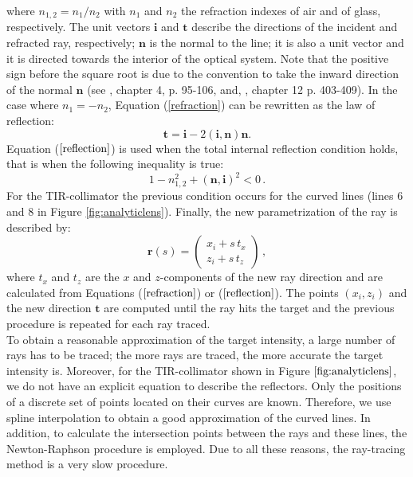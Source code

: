 where $n_{1,2}=n_1/n_2$ with $n_1$ and $n_2$ the refraction indexes of air and of glass, respectively.
The unit vectors $\textbf{i}$ and $\textbf{t}$ describe the directions of the incident and refracted ray, respectively; $\textbf{n}$ is the normal to the line; it is also a unit vector and it is directed towards the interior of the optical system.
Note that the positive sign before the square root is due to the convention to take the inward direction of the normal $\textbf{n}$ (see \cite{hecht1998hecht}, chapter 4, p. 95-106, and, \cite{chaves2008introduction}, chapter 12 p. 403-409).
In the case where $n_1 = -n_2$, Equation (\ref{refraction}) can be rewritten as the law of reflection:
\begin{equation}\label{reflection}
\textbf{t} = \textbf{i}-2(\textbf{i}, \textbf{n})\textbf{n}.
\end{equation}
Equation ($\ref{reflection}$) is used when the total internal reflection condition holds, that is when the following inequality is true:
\begin{equation}\label{eq: Tir-condition}
1-n_{1,2}^2+(\textbf{n},\textbf{i})^2<0\,.
\end{equation}
For the TIR-collimator the previous condition occurs for the curved lines (lines $6$ and $8$ in Figure \ref{fig:analyticlens}).
Finally, the new parametrization of the ray is described by:
\begin{equation}
\textbf{r}(s)=
\begin{pmatrix}
x_i+s\,t_{x} \\ z_i+s\,t_{z}
\end{pmatrix}\,,
\end{equation}
where
$t_{x}$ and $t_{z}$ are the $x$ and $z$-components of the new ray direction and are calculated from Equations ($\ref{refraction}$) or ($\ref{reflection}$).
The points $(x_\textit{i}, z_\textit{i})$ and the new direction $\textbf{t}$ are computed until the ray hits the target and the previous procedure is repeated for each ray traced. \\
\indent To obtain a reasonable approximation of the target intensity, a large number of rays has to be traced; the more rays are traced, the more accurate the target intensity is.
Moreover, for the TIR-collimator shown in Figure $\ref{fig:analyticlens}$, we do not have an explicit equation to describe the reflectors. Only the positions of a discrete set of points located on their curves are known.
Therefore, we use spline interpolation to obtain a good approximation of the curved lines. In addition, to calculate the intersection points between the rays and these lines, the Newton-Raphson procedure is employed. Due to all these reasons, the ray-tracing method is a very slow procedure.\\
